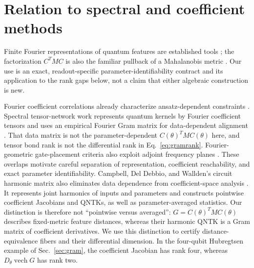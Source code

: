 \section{Relation to spectral and coefficient methods}
\label{app:spectral_context}
Finite Fourier
representations of quantum features are established tools
\cite{schuldFourier}; the factorization $C^TMC$ is also the familiar
pullback of a Mahalanobis metric \cite{weinberger}.
Our use is an exact, readout-specific parameter-identifiability
contract and its application to the rank gaps below, not a claim
that either algebraic construction is new.

Fourier coefficient correlations already characterize ansatz-dependent
constraints \cite{fingerprints}. Spectral tensor-network work represents
quantum kernels by Fourier coefficient tensors and uses an empirical
Fourier Gram matrix for data-dependent alignment \cite{spectralTN}.
That data matrix is not the parameter-dependent $C(\theta)^TMC(\theta)$
here, and tensor bond rank is not the differential rank in
Eq.~\eqref{eq:gramrank}. Fourier-geometric gate-placement criteria
also exploit adjoint frequency planes \cite{fourierDesign}.
These overlaps motivate careful separation of representation,
coefficient reachability, and exact parameter identifiability.
Campbell, Del Debbio, and Wallden's circuit harmonic matrix also
eliminates data dependence from coefficient-space analysis
\cite{CHM}. It represents joint harmonics of inputs and parameters and
constructs pointwise coefficient Jacobians and QNTKs, as well as
parameter-averaged statistics. Our distinction is therefore not
``pointwise versus averaged'': $G=C(\theta)^TMC(\theta)$ describes
fixed-metric feature distances, whereas their harmonic QNTK is a
Gram matrix of coefficient derivatives. We use this distinction to
certify distance-equivalence fibers and their differential dimension.
In the four-qubit Hubregtsen example of Sec.~\ref{sec:gram}, the
coefficient Jacobian has rank four, whereas $D_\theta\operatorname{vech}G$
has rank two.
